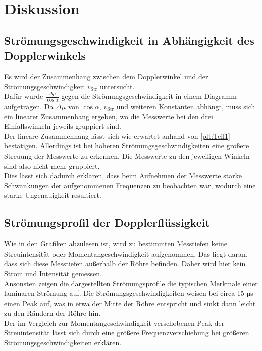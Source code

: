 \section{Diskussion}
\label{sec:Diskussion}

\subsection{Strömungsgeschwindigkeit in Abhängigkeit des Dopplerwinkels}

Es wird der Zusammenhang zwischen dem Dopplerwinkel und der Strömungsgeschwindigkeit $v_{\mathrm{Str}}$
untersucht.\\
Dafür wurde $\frac{\Delta \mu}{\cos{\alpha}}$ gegen die Strömungsgeschwindigkeit in einem Diagramm
aufgetragen. Da $\Delta \mu$ von $\cos{\alpha}$, $v_{\mathrm{Str}}$ und weiteren Konstanten abhängt,
muss sich ein linearer Zusammenhang ergeben, wo die Messwerte bei den drei Einfallswinkeln jeweils
gruppiert sind.\\
Der lineare Zusammenhang lässt sich wie erwartet anhand von \autoref{plt:Teil1} bestätigen. Allerdings
ist bei höheren Strömungsgeschwindigkeiten eine größere Streuung der Messwerte zu erkennen. Die Messwerte
zu den jeweiligen Winkeln sind also nicht mehr gruppiert.\\
Dies lässt sich dadurch erklären, dass beim Aufnehmen der Messwerte starke Schwankungen der aufgenommenen 
Frequenzen zu beobachten war, wodurch eine starke Ungenauigkeit resultiert.\\

\subsection{Strömungsprofil der Dopplerflüssigkeit}

Wie in den Grafiken abzulesen ist, wird zu bestimmten Messtiefen keine Streuintensität oder
Momentangeschwindigkeit aufgenommen. Das liegt daran, dass sich diese Messtiefen außerhalb der Röhre
befinden. Daher wird hier kein Strom und Intensität gemessen.\\
Ansonsten zeigen die dargestellten Strömungsprofile die typischen Merkmale einer laminaren Strömung 
auf. Die Strömungsgeschwindigkeiten weisen bei circa 15 µs einen Peak auf, was in etwa der Mitte der
Röhre entspricht und sinkt dann leicht zu den Rändern der Röhre hin.\\
Der im Vergleich zur Momentangeschwindigkeit verschobenen Peak der Streuintensität lässt sich durch
eine größere Frequenzverschiebung bei größeren Strömungsgeschwindigkeiten erklären.\\

\label{Anhang}